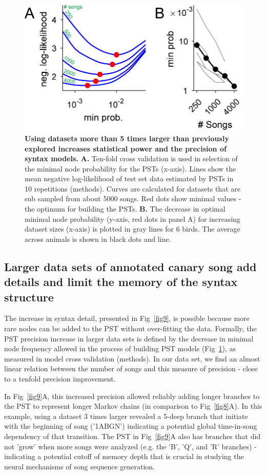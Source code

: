 \documentclass[10pt,letterpaper]{article}
\begin{document}
\begin{figure}[!h]
\includegraphics[scale=1.0]{Figures/fig10/Figure10_v1.png}
\caption{{\bf Using datasets more than 5 times larger than previously explored increases statistical power and the precision of syntax models.}
\textbf{A.} Ten-fold cross validation is used in selection of the minimal node probability for the PSTs (x-axis). Lines show the mean negative log-likelihood of test set data estimated by PSTs in 10 repetitions (methods). Curves are calculated for datasets that are sub sampled from about 5000 songs. Red dots show minimal values - the optimum for building the PSTs.
\textbf{B.} The decrease in optimal minimal node probability (y-axis, red dots in panel A) for increasing dataset sizes (x-axis) is plotted in gray lines for 6 birds. The average across animals is shown in black dots and line.}
\label{fig10}
\end{figure}

\subsection*{Larger data sets of annotated canary song add details and limit the memory of the syntax structure}
The increase in syntax detail, presented in Fig~\ref{fig9}, is possible because more rare nodes can be added to the PST without over-fitting the data. Formally, the PST precision increase in larger data sets is defined by the decrease in minimal node frequency allowed in the process of building PST models (Fig~\ref{fig10}), as measured in model cross validation (methods). In our data set, we find an almost linear relation between the number of songs and this measure of precision - close to a tenfold precision improvement.

In Fig~\ref{fig9}A, this increased precision allowed reliably adding longer branches to the PST to represent longer Markov chains (in comparison to Fig~\ref{fig8}A). In this example, using a dataset 3 times larger revealed a 5-deep branch that initiate with the beginning of song ('1ABGN') indicating a potential global time-in-song dependency of that transition. The PST in Fig~\ref{fig9}A also has branches that did not 'grow' when more songs were analyzed (e.g. the 'B', 'Q', and 'R' branches) - indicating a potential cutoff of memory depth that is crucial in studying the neural mechanisms of song sequence generation. 
\end{document}
